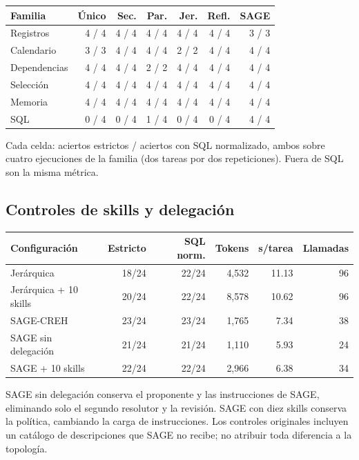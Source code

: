 \begin{center}\small\begin{tabularx}{\linewidth}{@{}Xrrrrrr@{}}\toprule
Familia & Único & Sec. & Par. & Jer. & Refl. & SAGE \\ \midrule
Registros & 4 / 4 & 4 / 4 & 4 / 4 & 4 / 4 & 4 / 4 & 3 / 3 \\
Calendario & 3 / 3 & 4 / 4 & 4 / 4 & 2 / 2 & 4 / 4 & 4 / 4 \\
Dependencias & 4 / 4 & 4 / 4 & 2 / 2 & 4 / 4 & 4 / 4 & 4 / 4 \\
Selección & 4 / 4 & 4 / 4 & 4 / 4 & 4 / 4 & 4 / 4 & 4 / 4 \\
Memoria & 4 / 4 & 4 / 4 & 4 / 4 & 4 / 4 & 4 / 4 & 4 / 4 \\
SQL & 0 / 4 & 0 / 4 & 1 / 4 & 0 / 4 & 0 / 4 & 4 / 4 \\
\bottomrule\end{tabularx}\end{center}

Cada celda: aciertos estrictos / aciertos con SQL normalizado, ambos sobre cuatro ejecuciones de la familia (dos tareas por dos repeticiones). Fuera de SQL son la misma métrica.

\subsection{Controles de skills y delegación}

\begin{center}\small
\setlength{\tabcolsep}{4pt}
\begin{tabularx}{\linewidth}{@{}Xrrrrr@{}}
\toprule Configuración & Estricto & SQL norm. & Tokens & s/tarea & Llamadas \\ \midrule
Jerárquica & 18/24 & 22/24 & 4,532 & 11.13 & 96 \\
Jerárquica + 10 skills & 20/24 & 22/24 & 8,578 & 10.62 & 96 \\
SAGE-CREH & 23/24 & 23/24 & 1,765 & 7.34 & 38 \\
SAGE sin delegación & 21/24 & 21/24 & 1,110 & 5.93 & 24 \\
SAGE + 10 skills & 22/24 & 22/24 & 2,966 & 6.38 & 34 \\
\bottomrule
\end{tabularx}\end{center}


SAGE sin delegación conserva el proponente y las instrucciones de SAGE, eliminando solo el segundo resolutor y la revisión. SAGE con diez skills conserva la política, cambiando la carga de instrucciones. Los controles originales incluyen un catálogo de descripciones que SAGE no recibe; no atribuir toda diferencia a la topología.


